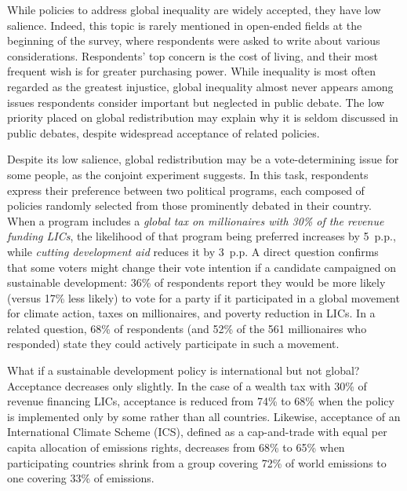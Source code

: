 \documentclass[12pt,english]{article}
\begin{document}
\begin{bibunit}
While policies to address global inequality are widely accepted, they have low salience. Indeed, this topic is rarely mentioned in open-ended fields at the beginning of the survey, where respondents were asked to write about various considerations. Respondents' top concern is the cost of living, and their most frequent wish is for greater purchasing power. While inequality is most often regarded as the greatest injustice, %
global inequality almost never appears among issues respondents consider important but neglected in public debate. The low priority placed on global redistribution may explain why it is seldom discussed in public debates, despite widespread acceptance of related policies.

Despite its low salience, global redistribution may be a vote-determining issue for some people, as %
the conjoint experiment suggests. 
In this task, respondents express their preference between two political programs, each composed of policies randomly selected from those prominently debated in their country. When a program includes a \textit{global tax on millionaires with 30\% of the revenue funding LICs}, the likelihood of that program being preferred increases by 5~p.p., while \textit{cutting development aid} reduces it by 3~p.p.  A direct question confirms that some voters might change their vote intention if a candidate campaigned on sustainable development: 36\% of respondents report they would be more likely (versus 17\% less likely) to vote for a party if it participated in a global movement for climate action, taxes on millionaires, and poverty reduction in LICs. In a related question, 68\% of respondents (and 52\% of the 561 millionaires %
who responded) state they could actively participate in such a movement. %

What if a sustainable development policy is international but not global? Acceptance decreases only slightly. In the case of a wealth tax with 30\% of revenue financing LICs, acceptance is reduced from 74\% to 68\% when the policy is implemented only by some %
rather than all countries. Likewise, acceptance of an International Climate Scheme (ICS), defined as a cap-and-trade with equal per capita allocation of emissions rights, decreases from 68\% to 65\% when participating countries shrink from a group covering 72\% of world emissions to one covering 33\% of emissions.


\end{bibunit}
\end{document}
